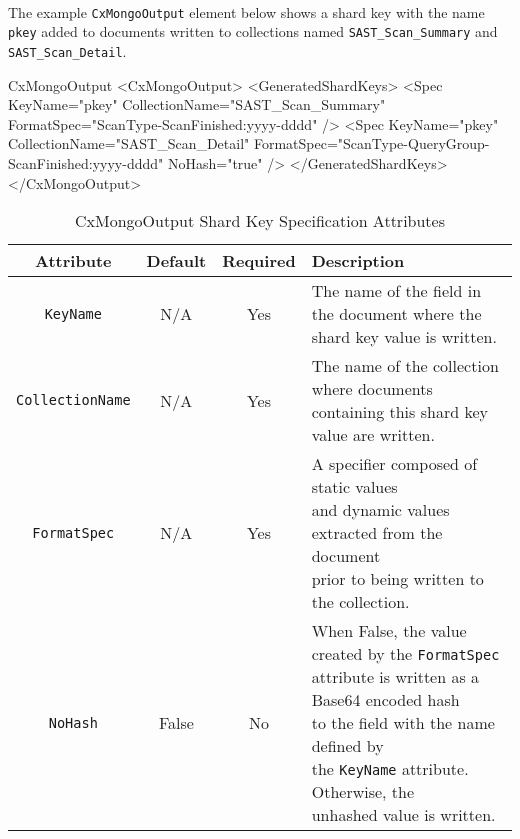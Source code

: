 \noindent\\The example \texttt{CxMongoOutput} element below shows a shard key with the name \texttt{pkey} added to documents
written to collections named \texttt{SAST\_Scan\_Summary} and \texttt{SAST\_Scan\_Detail}.

\begin{xml}{CxMongoOutput}{\contentvariables}{}
<CxMongoOutput>
    <GeneratedShardKeys>
        <Spec 
            KeyName="pkey" 
            CollectionName="SAST_Scan_Summary" 
            FormatSpec="{ScanType}-{ScanFinished:yyyy-dddd}"
            />
        <Spec 
            KeyName="pkey" 
            CollectionName="SAST_Scan_Detail" 
            FormatSpec="{ScanType}-{QueryGroup}-{ScanFinished:yyyy-dddd}" 
            NoHash="true" 
            />
    </GeneratedShardKeys>
</CxMongoOutput>
\end{xml}
    

\begin{table}[h]
    \caption{CxMongoOutput Shard Key Specification Attributes}        
    \begin{tabularx}{\textwidth}{cccl}
        \toprule
        \textbf{Attribute} & \textbf{Default} & \textbf{Required} & \textbf{Description}\\
        \midrule
        \texttt{KeyName} & N/A & Yes & \makecell[l]{The name of the field in the document where the\\shard key value is written.}\\
        \midrule
        \texttt{CollectionName} & N/A & Yes & \makecell[l]{The name of the collection where documents\\
        containing this shard key value are written.}\\
        \midrule
        \texttt{FormatSpec} & N/A & Yes & \makecell[l]{A specifier composed of static values\\
        and dynamic values extracted from the document\\
        prior to being written to the collection.}\\
        \midrule
        \texttt{NoHash} & False & No & \makecell[l]{When False, the value created by the \texttt{FormatSpec}\\
        attribute is written as a Base64 encoded hash\\
        to the field with the name defined by\\
        the \texttt{KeyName} attribute.  Otherwise, the\\
        unhashed value is written.}\\
        \bottomrule
    \end{tabularx}
\end{table}
